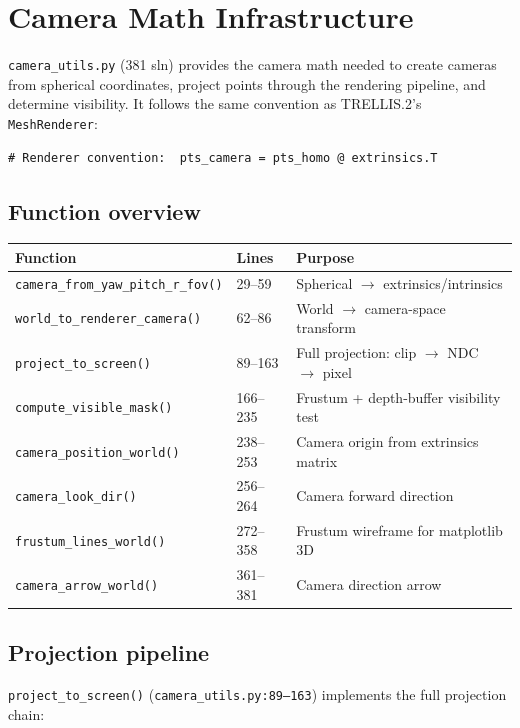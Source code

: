 \section{Camera Math Infrastructure}

\texttt{camera\_utils.py} (381 sln) provides the camera math needed to
create cameras from spherical coordinates, project points through the
rendering pipeline, and determine visibility. It follows the same
convention as TRELLIS.2's \texttt{MeshRenderer}:
\begin{lstlisting}
# Renderer convention:  pts_camera = pts_homo @ extrinsics.T
\end{lstlisting}

\subsection{Function overview}

\begin{tabular}{lll}
\toprule
Function & Lines & Purpose \\
\midrule
\texttt{camera\_from\_yaw\_pitch\_r\_fov()} & 29--59 & Spherical $\to$ extrinsics/intrinsics \\
\texttt{world\_to\_renderer\_camera()} & 62--86 & World $\to$ camera-space transform \\
\texttt{project\_to\_screen()} & 89--163 & Full projection: clip $\to$ NDC $\to$ pixel \\
\texttt{compute\_visible\_mask()} & 166--235 & Frustum + depth-buffer visibility test \\
\texttt{camera\_position\_world()} & 238--253 & Camera origin from extrinsics matrix \\
\texttt{camera\_look\_dir()} & 256--264 & Camera forward direction \\
\texttt{frustum\_lines\_world()} & 272--358 & Frustum wireframe for matplotlib 3D \\
\texttt{camera\_arrow\_world()} & 361--381 & Camera direction arrow \\
\bottomrule
\end{tabular}

\subsection{Projection pipeline}

\texttt{project\_to\_screen()} (\texttt{camera\_utils.py:89--163})
implements the full projection chain:


